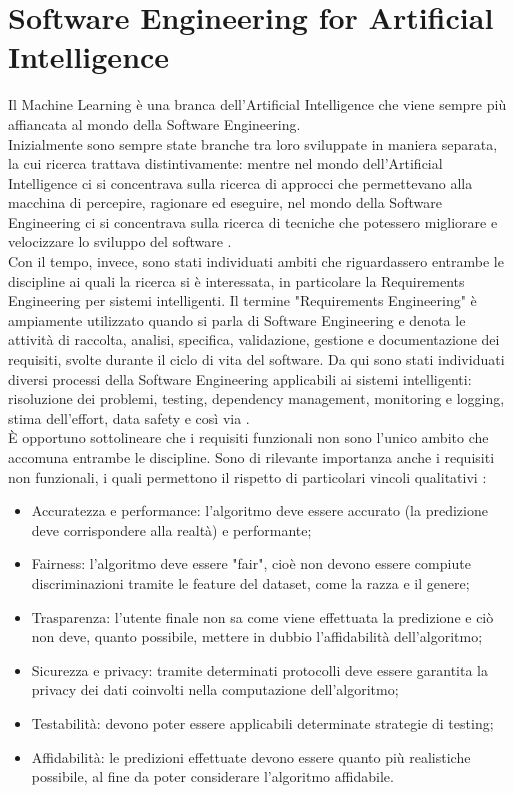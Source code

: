 \section{Software Engineering for Artificial Intelligence}
Il Machine Learning è una branca dell'Artificial Intelligence che viene sempre più affiancata al mondo della Software Engineering.\\
Inizialmente sono sempre state branche tra loro sviluppate in maniera separata, la cui ricerca trattava distintivamente: mentre nel mondo dell'Artificial Intelligence ci si concentrava sulla ricerca di approcci che permettevano alla macchina di percepire, ragionare ed eseguire, nel mondo della Software Engineering ci si concentrava sulla ricerca di tecniche che potessero migliorare e velocizzare lo sviluppo del software \cite{rech2004artificial}.\\
Con il tempo, invece, sono stati individuati ambiti che riguardassero entrambe le discipline ai quali la ricerca si è interessata, in particolare la Requirements Engineering per sistemi intelligenti. Il termine "Requirements Engineering" è ampiamente utilizzato quando si parla di Software Engineering e denota le attività di raccolta, analisi, specifica, validazione, gestione e documentazione dei requisiti, svolte durante il ciclo di vita del software.
Da qui sono stati individuati diversi processi della Software Engineering applicabili ai sistemi intelligenti: risoluzione dei problemi, testing, dependency management, monitoring e logging, stima dell'effort, data safety e così via \cite{belani2019requirements}.\\
È opportuno sottolineare che i requisiti funzionali non sono l'unico ambito che accomuna entrambe le discipline. Sono di rilevante importanza anche i requisiti non funzionali, i quali permettono il rispetto di particolari vincoli qualitativi \cite{horkoff2019non}:
\begin{itemize}
  \item Accuratezza e performance: l'algoritmo deve essere accurato (la predizione deve corrispondere alla realtà) e performante;
  \item Fairness: l'algoritmo deve essere "fair", cioè non devono essere compiute discriminazioni tramite le feature del dataset, come la razza e il genere;
  \item Trasparenza: l'utente finale non sa come viene effettuata la predizione e ciò non deve, quanto possibile, mettere in dubbio l'affidabilità dell'algoritmo;
  \item Sicurezza e privacy: tramite determinati protocolli deve essere garantita la privacy dei dati coinvolti nella computazione dell'algoritmo;
  \item Testabilità: devono poter essere applicabili determinate strategie di testing;
  \item Affidabilità: le predizioni effettuate devono essere quanto più realistiche possibile, al fine da poter considerare l'algoritmo affidabile.
\end{itemize}

